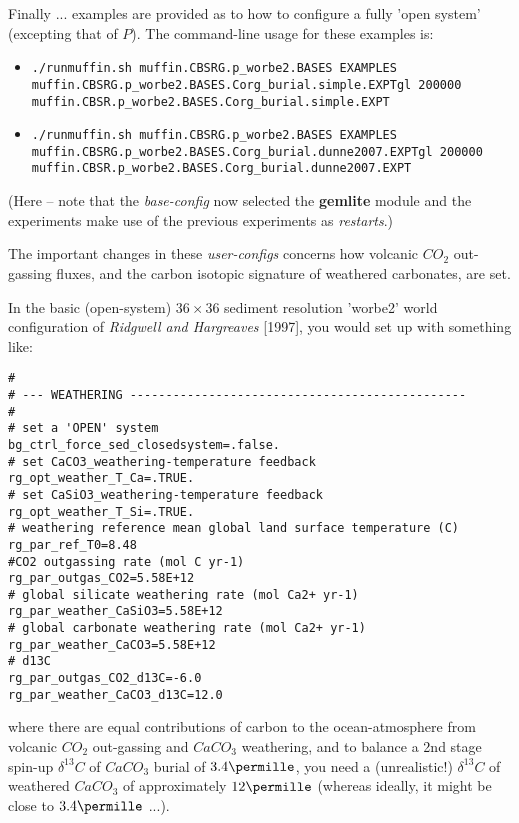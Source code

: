 \noindent Finally ... examples are provided as to how to configure a fully 'open system' (excepting that of \(P\)). The command-line usage for these examples is:
\begin{itemize}[noitemsep]
\vspace{1mm}
\item []
\small\vspace{-0mm}\begin{verbatim}
./runmuffin.sh muffin.CBSRG.p_worbe2.BASES EXAMPLES
muffin.CBSRG.p_worbe2.BASES.Corg_burial.simple.EXPTgl 200000
muffin.CBSR.p_worbe2.BASES.Corg_burial.simple.EXPT
\end{verbatim}\vspace{-0mm}\normalsize
\vspace{1mm}
\item []
\small\vspace{-0mm}\begin{verbatim}
./runmuffin.sh muffin.CBSRG.p_worbe2.BASES EXAMPLES
muffin.CBSRG.p_worbe2.BASES.Corg_burial.dunne2007.EXPTgl 200000
muffin.CBSR.p_worbe2.BASES.Corg_burial.dunne2007.EXPT
\end{verbatim}\vspace{-0mm}\normalsize
\end{itemize}
\vspace{1mm}
(Here -- note that the \textit{base-config} now selected the \textbf{gemlite} module and the experiments make use of the previous experiments as \textit{restarts}.)

The important changes in these \textit{user-configs} concerns how volcanic \(CO_{2}\) out-gassing fluxes, and the carbon isotopic signature of weathered carbonates, are set.

\vspace{1mm}
In the basic (open-system) \(36\times 36\) sediment resolution 'worbe2' world configuration of \textit{Ridgwell and Hargreaves} [1997], you would set up with something like:

\vspace{-1mm}\footnotesize\begin{verbatim}
#
# --- WEATHERING -----------------------------------------------
#
# set a 'OPEN' system
bg_ctrl_force_sed_closedsystem=.false.
# set CaCO3_weathering-temperature feedback
rg_opt_weather_T_Ca=.TRUE.
# set CaSiO3_weathering-temperature feedback
rg_opt_weather_T_Si=.TRUE.
# weathering reference mean global land surface temperature (C)
rg_par_ref_T0=8.48
#CO2 outgassing rate (mol C yr-1)
rg_par_outgas_CO2=5.58E+12
# global silicate weathering rate (mol Ca2+ yr-1)
rg_par_weather_CaSiO3=5.58E+12
# global carbonate weathering rate (mol Ca2+ yr-1)
rg_par_weather_CaCO3=5.58E+12
# d13C
rg_par_outgas_CO2_d13C=-6.0
rg_par_weather_CaCO3_d13C=12.0
\end{verbatim}\normalsize\vspace{-1mm}
where there are equal contributions of carbon to the ocean-atmosphere from volcanic \(CO_{2}\) out-gassing and \(CaCO_{3}\) weathering, and to balance a 2nd stage spin-up \(\delta^{13}C\) of \(CaCO_{3}\) burial of \(3.4\permille\), you need a (unrealistic!) \(\delta^{13}C\) of weathered \(CaCO_{3}\) of approximately \(12\permille\) (whereas ideally, it might be close to \(3.4\permille\) ...).

